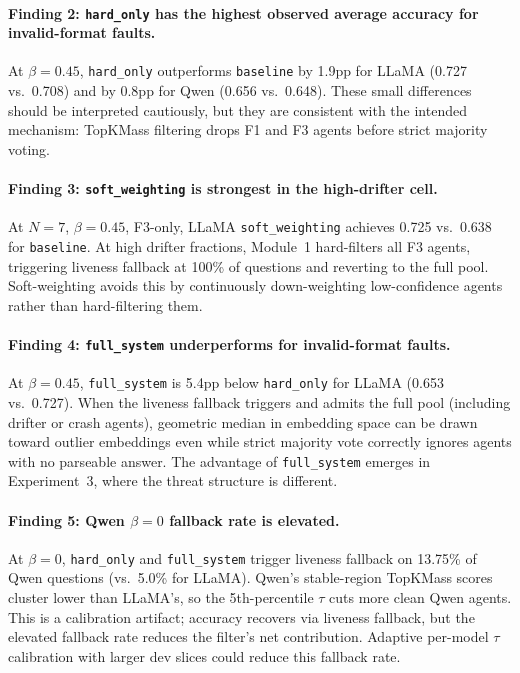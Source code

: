 \documentclass[11pt]{article}
\begin{document}
\paragraph{Finding 2: \texttt{hard\_only} has the highest observed average
accuracy for invalid-format faults.}
At $\beta=0.45$, \texttt{hard\_only} outperforms \texttt{baseline} by 1.9pp for
LLaMA (0.727 vs.\ 0.708) and by 0.8pp for Qwen (0.656 vs.\ 0.648). These small
differences should be interpreted cautiously, but they are consistent with the
intended mechanism: TopKMass filtering drops F1 and F3 agents before strict
majority voting.

\paragraph{Finding 3: \texttt{soft\_weighting} is strongest in the high-drifter
cell.}
At $N=7$, $\beta=0.45$, F3-only, LLaMA \texttt{soft\_weighting} achieves 0.725
vs.\ 0.638 for \texttt{baseline}. At high drifter fractions, Module~1
hard-filters all F3 agents, triggering liveness fallback at 100\% of questions
and reverting to the full pool. Soft-weighting avoids this by continuously
down-weighting low-confidence agents rather than hard-filtering them.

\paragraph{Finding 4: \texttt{full\_system} underperforms for invalid-format
faults.}
At $\beta=0.45$, \texttt{full\_system} is 5.4pp below \texttt{hard\_only} for
LLaMA (0.653 vs.\ 0.727). When the liveness fallback triggers and admits the
full pool (including drifter or crash agents), geometric median in embedding
space can be drawn toward outlier embeddings even while strict majority vote
correctly ignores agents with no parseable answer. The advantage of
\texttt{full\_system} emerges in Experiment~3, where the threat structure is
different.

\paragraph{Finding 5: Qwen $\beta=0$ fallback rate is elevated.}
At $\beta=0$, \texttt{hard\_only} and \texttt{full\_system} trigger liveness
fallback on 13.75\% of Qwen questions (vs.\ 5.0\% for LLaMA). Qwen's
stable-region TopKMass scores cluster lower than LLaMA's, so the 5th-percentile
$\tau$ cuts more clean Qwen agents. This is a calibration artifact; accuracy
recovers via liveness fallback, but the elevated fallback rate reduces the
filter's net contribution. Adaptive per-model $\tau$ calibration with larger dev
slices could reduce this fallback rate.
\end{document}
